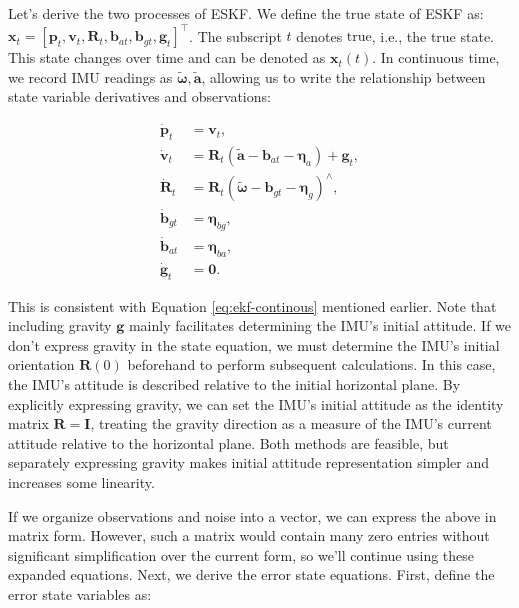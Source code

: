 Let's derive the two processes of ESKF. We define the true state of ESKF as: $\bm{x}_t = [\bm{p}_t, \bm{v}_t, \bm{R}_t, \bm{b}_{at}, \bm{b}_{gt}, \bm{g}_t]^\top$. The subscript $t$ denotes $\text{true}$, i.e., the true state. This state changes over time and can be denoted as $\bm{x}_t(t)$. In continuous time, we record IMU readings as $\tilde{\boldsymbol{\omega}}, \tilde{\bm{a}}$, allowing us to write the relationship between state variable derivatives and observations:

\begin{subequations}\label{eq:eskf-true-state}
	\begin{align}
		\dot{\bm{p}}_t &= \bm{v}_t, \\
		\dot{\bm{v}}_t &= \bm{R}_t (\tilde{\bm{a}} - \bm{b}_{at} - \boldsymbol{\eta}_a) + \bm{g}_t, \\
		\dot{\bm{R}}_t &= \bm{R}_t \left( \tilde{\boldsymbol{\omega}} - \bm{b}_{gt} - \boldsymbol{\eta}_g \right)^\wedge, \\
		\dot{\bm{b}}_{gt} &= \boldsymbol{\eta}_{bg}, \\
		\dot{\bm{b}}_{at} &= \boldsymbol{\eta}_{ba}, \\ 
		\dot{\bm{g}}_t &= \bm{0}.
	\end{align}
\end{subequations}

This is consistent with Equation \eqref{eq:ekf-continous} mentioned earlier. Note that including gravity $\bm{g}$ mainly facilitates determining the IMU's initial attitude. If we don't express gravity in the state equation, we must determine the IMU's initial orientation $\bm{R}(0)$ beforehand to perform subsequent calculations. In this case, the IMU's attitude is described relative to the initial horizontal plane. By explicitly expressing gravity, we can set the IMU's initial attitude as the identity matrix $\bm{R}=\bm{I}$, treating the gravity direction as a measure of the IMU's current attitude relative to the horizontal plane. Both methods are feasible, but separately expressing gravity makes initial attitude representation simpler and increases some linearity\cite{Lupton2009}.

If we organize observations and noise into a vector, we can express the above in matrix form. However, such a matrix would contain many zero entries without significant simplification over the current form, so we'll continue using these expanded equations. Next, we derive the error state equations. First, define the error state variables as:

